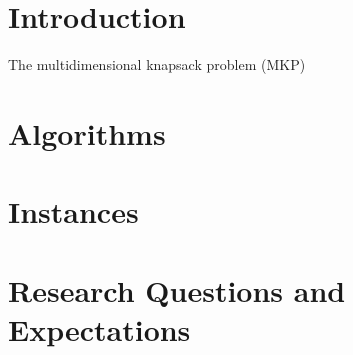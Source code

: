 \documentclass{article}
\author{Marcos Daniel Baroni}
\begin{document}
%
%

\section{Introduction}

The multidimensional knapsack problem (MKP) 



\section{Algorithms}

\section{Instances}

\section{Research Questions and Expectations}
\end{document}
